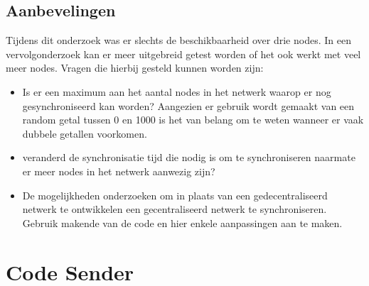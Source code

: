\documentclass{article}
\begin{document}
\subsection{Aanbevelingen}
Tijdens dit onderzoek was er slechts de beschikbaarheid over drie nodes. In een vervolgonderzoek kan er meer uitgebreid getest worden of het ook werkt met veel meer nodes. Vragen die hierbij gesteld kunnen worden zijn:
\begin{itemize}
	\item Is er een maximum aan het aantal nodes in het netwerk waarop er nog gesynchroniseerd kan worden? Aangezien er gebruik wordt gemaakt van een random getal tussen 0 en 1000 is het van belang om te weten wanneer er vaak dubbele getallen voorkomen. 
	\item veranderd de synchronisatie tijd die nodig is om te synchroniseren naarmate er meer nodes in het netwerk aanwezig zijn?
	\item De mogelijkheden onderzoeken om in plaats van een gedecentraliseerd netwerk te ontwikkelen een gecentraliseerd netwerk te synchroniseren. Gebruik makende van de code en hier enkele aanpassingen aan te maken. 
\end{itemize}
\newpage



\newpage
\appendix

\section{Code Sender}

\newpage
\end{document}

